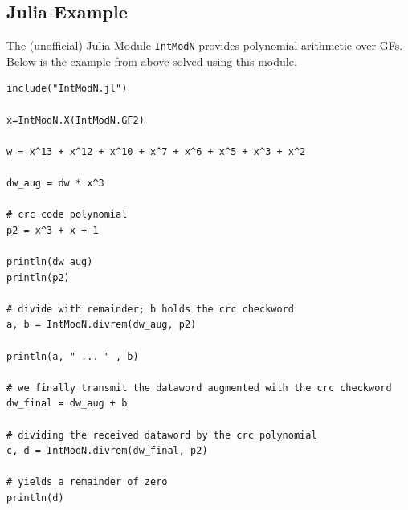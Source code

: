 \subsection{Julia Example}\label{julia-example}

The (unofficial) Julia Module \texttt{IntModN} provides polynomial
arithmetic over GFs. Below is the example from above solved using this
module.

\begin{verbatim}
include("IntModN.jl")

x=IntModN.X(IntModN.GF2)

w = x^13 + x^12 + x^10 + x^7 + x^6 + x^5 + x^3 + x^2

dw_aug = dw * x^3

# crc code polynomial
p2 = x^3 + x + 1

println(dw_aug)
println(p2)

# divide with remainder; b holds the crc checkword
a, b = IntModN.divrem(dw_aug, p2)

println(a, " ... " , b)

# we finally transmit the dataword augmented with the crc checkword
dw_final = dw_aug + b

# dividing the received dataword by the crc polynomial
c, d = IntModN.divrem(dw_final, p2)

# yields a remainder of zero
println(d)
\end{verbatim}
